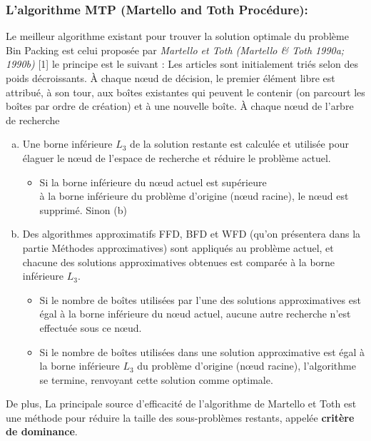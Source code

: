 \documentclass[class=report, crop=false]{standalone}
\begin{document}
    \subsubsection*{L’algorithme MTP (Martello and Toth Procédure):}
    Le meilleur algorithme existant pour trouver la solution optimale du problème Bin Packing est celui proposée par  \emph{Martello et Toth (Martello \& Toth 1990a; 1990b)} [1] le principe est le suivant :  
Les articles sont initialement triés selon des poids décroissants. À chaque nœud de décision, le premier élément libre est attribué, à son tour, aux boîtes existantes qui peuvent le contenir (on parcourt les boîtes par ordre de création) et à une nouvelle boîte. 
À chaque nœud de l'arbre de recherche 
\begin{enumerate}[a.]
    \item Une borne inférieure \(L_3\) de la solution restante est calculée et utilisée pour élaguer le nœud de l'espace de recherche et réduire le problème actuel.
        \begin{itemize}
            \item Si la borne inférieure du nœud actuel est supérieure \\
            à la borne inférieure du problème d’origine (nœud racine), le nœud est supprimé. Sinon (b)
        \end{itemize}
    \item Des algorithmes approximatifs FFD, BFD et WFD (qu’on présentera dans la partie Méthodes approximatives) sont appliqués au problème actuel, et chacune des solutions approximatives obtenues est comparée à la borne inférieure \(L_3\).
        \begin{itemize}
            \item Si le nombre de boîtes utilisées par l'une des solutions approximatives est égal à la borne inférieure du nœud actuel, aucune autre recherche n'est effectuée sous ce nœud. 
            \item Si le nombre de boîtes utilisées dans une solution approximative est égal à la borne inférieure \(L_3\) du problème d'origine (nœud racine), l'algorithme se termine, renvoyant cette solution comme optimale.
        \end{itemize}
\end{enumerate}
De plus, La principale source d'efficacité de l'algorithme de Martello et Toth est une méthode pour réduire la taille des sous-problèmes restants, appelée \textbf{critère de dominance}.
\end{document}
